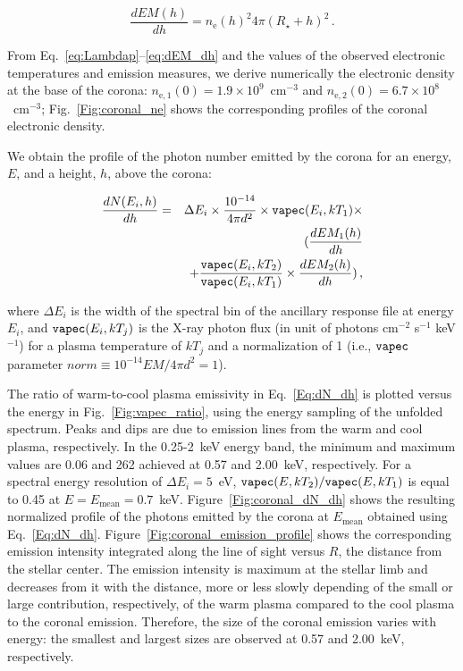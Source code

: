 \documentclass[iop]{emulateapj}
\begin{document}
\begin{equation}
\frac{dEM(h)}{dh}=
n_\mathrm{e}(h)^2 4\pi(R_\star+h)^2 \,.
\label{eq:dEM_dh}
\end{equation}


From Eq.~\ref{eq:Lambdap}--\ref{eq:dEM_dh} and the values of the observed electronic temperatures and emission measures, we derive 
numerically the electronic density at the base of the corona: $n_\mathrm{e,1}(0)=1.9\times10^9$~cm$^{-3}$ and $n_\mathrm{e,2}(0)=6.7\times10^8$~cm$^{-3}$;
Fig.~\ref{Fig:coronal_ne} shows the corresponding profiles of the coronal electronic density.

We obtain the profile of the photon number emitted by the corona for an energy, $E$, and a height, $h$, above the corona:

\begin{eqnarray}
\frac{dN(E_i,h)}{dh} &= & \Delta E_i\times\frac{10^{-14}}{4\pi d^2}\times {\tt vapec}(E_i,kT_1)\times\nonumber \\
		 &  & (\frac{dEM_1(h)}{dh}\nonumber\\
		 &  & +\frac{{\tt vapec}(E_i,kT_2)}{{\tt vapec}(E_i,kT_1)}\times\frac{dEM_2(h)}{dh})\,,
		 \label{Eq:dN_dh} 
\end{eqnarray}

where $\Delta E_i$ is the width of the spectral bin of the ancillary response file at energy $E_i$, and ${\tt vapec}(E_i,kT_j)$ 
is the X-ray photon flux (in unit of photons cm$^{-2}$ s$^{-1}$ keV$^{-1}$) for a plasma temperature of $kT_j$ and a normalization of 1 
(i.e., ${\tt vapec}$ parameter $norm\equiv10^{-14}EM/4\pi d^2=1$).

The ratio of warm-to-cool plasma emissivity in Eq.~\ref{Eq:dN_dh} is plotted versus the energy in Fig.~\ref{Fig:vapec_ratio},
using the energy sampling of the unfolded spectrum. Peaks and dips are due to emission lines from the warm and cool plasma, respectively.
In the 0.25-2~keV energy band, the minimum and maximum values are 0.06 and 262 achieved at 0.57 and 2.00~keV, respectively. For a spectral 
energy resolution of $\Delta E_i=5$~eV, ${\tt vapec}(E,kT_2)/{\tt vapec}(E,kT_1)$ is equal to 0.45 at $E=E_\mathrm{mean}=0.7$~keV.
Figure~\ref{Fig:coronal_dN_dh} shows the resulting normalized profile of the photons emitted by the corona at $E_\mathrm{mean}$ 
obtained using Eq.~\ref{Eq:dN_dh}. Figure~\ref{Fig:coronal_emission_profile} shows the corresponding emission intensity integrated 
along the line of sight versus $R$, the distance from the stellar center. The emission intensity is maximum at the stellar limb 
and decreases from it with the distance, more or less slowly depending of the small or large contribution, respectively, of the warm plasma 
compared to the cool plasma to the coronal emission. Therefore, the size of the coronal emission varies with energy: the smallest and 
largest sizes are observed at 0.57 and 2.00~keV, respectively.
\end{document}
